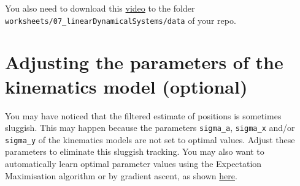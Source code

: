\documentclass[12pt]{article}
\begin{document}
You also need to download this
\href{https://www.gatsby.ucl.ac.uk/~rapela/neuroinformatics/2024/worksheets/linearDynamicalSystems/videos/raw/FrameTop_2021-06-03T17-00-00_end001000.avi}{video}
to the folder \texttt{worksheets/07\_linearDynamicalSystems/data} of your repo.

\section{Adjusting the parameters of the kinematics model (optional)}

You may have noticed that the filtered estimate of positions is sometimes
sluggish. This may happen because the parameters \texttt{sigma\_a},
\texttt{sigma\_x} and/or \texttt{sigma\_y} of the kinematics models are not set
to optimal values. Adjust these parameters to eliminate this sluggish tracking.
You may also want to automatically learn optimal parameter values using the
Expectation Maximisation algorithm or by gradient ascent, as shown
\href{https://joacorapela.github.io/lds_python/auto_examples/tracking/plotEMvsGAcomparisonForagingMouse.html#sphx-glr-auto-examples-tracking-plotemvsgacomparisonforagingmouse-py}{here}.



\end{document}
